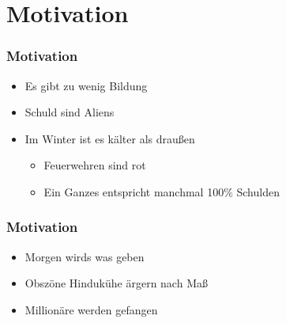 \section{Motivation}

\begin{frame}
	\frametitle{Motivation}
	\begin{itemize}
		\item Es gibt zu wenig Bildung
		\item Schuld sind Aliens
		\item Im Winter ist es kälter als draußen
		\begin{itemize}
			\item Feuerwehren sind rot
			\item Ein Ganzes entspricht manchmal 100\% Schulden
		\end{itemize}
	\end{itemize}
\end{frame}

\begin{frame}
	\frametitle{Motivation}
	\begin{itemize}
		\item Morgen wirds was geben
		\item Obszöne Hindukühe ärgern nach Maß
		\item Millionäre werden gefangen
	\end{itemize}
\end{frame}
